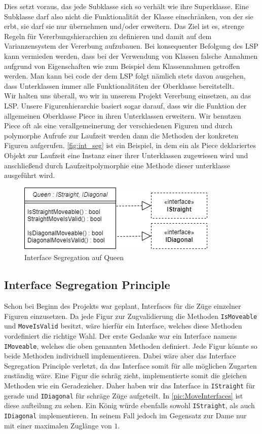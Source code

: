 \documentclass[
10pt, %
a4paper, %
oneside, %
headinclude,footinclude, %
BCOR5mm, %
]{scrartcl}
\begin{document}
\begin{onehalfspace}
Dies setzt voraus, das jede Subklasse sich so verhält wie ihre Superklasse. Eine Subklasse darf also nicht die Funktionalität der Klasse einschränken, von der sie erbt, sie darf sie nur übernehmen und/oder erweitern. Das Ziel ist es, strenge Regeln für Vererbungshierarchien zu definieren und damit auf dem Varianzensystem der Vererbung aufzubauen. Bei konsequenter Befolgung des LSP kann vermieden werden, dass bei der Verwendung von Klassen falsche Annahmen aufgrund von Eigenschaften wie zum Beispiel dem Klassennahmen getroffen werden. Man kann bei code der dem LSP folgt nämlich stets davon ausgehen, dass Unterklassen immer alle Funktionalitäten der Oberklasse bereitstellt.
\\
Wir halten uns überall, wo wir in unserem Projekt Vererbung einsetzen, an das LSP. Unsere Figurenhierarchie basiert sogar darauf, dass wir die Funktion der allgemeinen Oberklasse Piece in ihren Unterklassen erweitern. Wir benutzen Piece oft als eine verallgemeinerung der verschiedenen Figuren und durch polymorphe Aufrufe zur Laufzeit werden dann die Methoden der konkreten Figuren aufgerufen. \autoref{fig:int_seg} ist ein Beispiel, in dem ein als Piece deklariertes Objekt zur Laufzeit eine Instanz einer ihrer Unterklassen zugewiesen wird und anschließend durch Laufzeitpolymorphie eine Methode dieser unterklasse ausgeführt wird.

\begin{figure}[ht]
	\centering
	\includegraphics[width=0.5\linewidth]{Diagonal_Straight.png}
	\caption[Interface Segregation auf Queen]{Interface Segregation auf Queen}
	\label{fig:int_seg}
\end{figure}

\subsection{Interface Segregation Principle}
Schon bei Beginn des Projekts war geplant, Interfaces für die Züge einzelner Figuren einzusetzen. Da jede Figur zur Zugvalidierung die Methoden \texttt{IsMoveable} und \texttt{MoveIsValid} besitzt, wäre hierfür ein Interface, welches diese Methoden vordefiniert die richtige Wahl. Der erste Gedanke war ein Interface namens \texttt{IMoveable}, welches die oben genannten Methoden definiert. Jede Figur könnte so beide Methoden individuell implementieren. Dabei wäre aber das Interface Segregation Principle verletzt, da das Interface somit für alle möglichen Zugarten zuständig wäre. Eine Figur die schräg zieht, implementierte somit die gleichen Methoden wie ein Geradezieher. Daher haben wir das Interface in \texttt{IStraight} für gerade und \texttt{IDiagonal} für schräge Züge aufgeteilt. In \autoref{pic:MoveInterfaces} ist diese aufteilung zu sehen. Ein König würde ebenfalls sowohl \texttt{IStraight}, als auch \texttt{IDiagonal} implementieren. In seinem Fall jedoch im Gegensatz zur Dame nur mit einer maximalen Zuglänge von $1$.


\end{onehalfspace}
\end{document}
